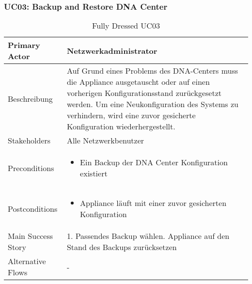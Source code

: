 \subsubsection{UC03: Backup and Restore DNA Center}
\begin{table}[H]
	\centering
	\begin{tabularx}{\textwidth}{l | X}
		Primary Actor   & Netzwerkadministrator        \\
		\hline
		Beschreibung   & Auf Grund eines Problems des DNA-Centers muss die Appliance ausgetauscht oder auf einen vorherigen Konfigurationsstand zurückgesetzt werden. Um eine Neukonfiguration des Systems zu verhindern, wird eine zuvor gesicherte Konfiguration wiederhergestellt.  \\ 
		\hline
		Stakeholders       & Alle Netzwerkbenutzer \\ 
		Preconditions      &
		\begin{itemize}	
			\item Ein Backup der DNA Center Konfiguration existiert
		\end{itemize}  \\
		\hline
		Postconditions     & 
		\begin{itemize}	
			\item Appliance läuft mit einer zuvor gesicherten Konfiguration
		\end{itemize}  \\
		\hline
		Main Success Story & 
		1.  Passendes Backup wählen\newline
		2.  Appliance auf den Stand des Backups zurücksetzen\newline
		\\
		\hline
		Alternative Flows  & -
	\end{tabularx}
	\caption{Fully Dressed UC03}
	\label{tab:UC03}
\end{table}

